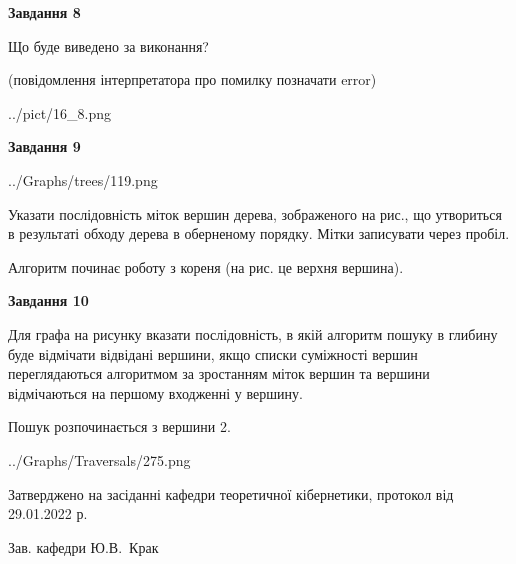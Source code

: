 \documentclass[12pt, ukrainian]{article}
\begin{document}
{\begin {large}
{\begin {center}\textbf{Завдання 8}\end {center}}\par
Що буде виведено за виконання?\par
 (повідомлення інтерпретатора про помилку позначати error)\par
\begin{center}
	{../pict/16_8.png}
\end{center}
\newpage

{\begin {center}\textbf{Завдання 9}\end {center}}\par

\begin{center}
	{../Graphs/trees/119.png}
\end{center}
Указати послідовність міток вершин дерева, зображеного на рис., що утвориться в результаті обходу дерева в оберненому порядку. Мітки записувати через пробіл.\par Алгоритм починає роботу з кореня (на рис. це верхня вершина).\par
\newpage

{\begin {center}\textbf{Завдання 10}\end {center}}\par
Для графа на рисунку вказати послідовність, в якій алгоритм пошуку в глибину буде відмічати відвідані вершини, якщо списки суміжності вершин переглядаються алгоритмом за зростанням міток вершин та вершини відмічаються на першому вход\-женні у вершину.\par
Пошук розпочинається з вершини 2.\par

\begin{center}
	{../Graphs/Traversals/275.png}
\end{center}\par
\newpage


\end {large}
}
{\smallskip \begin {small} Затверджено на засіданні кафедри теоретичної кібернетики, протокол  від   29.01.2022 р.\par\smallskip\smallskip
{\parbox {6.5 cm}{Зав. кафедри \dotfill Ю.В.~Крак}} \end{small}}
\end{document}
